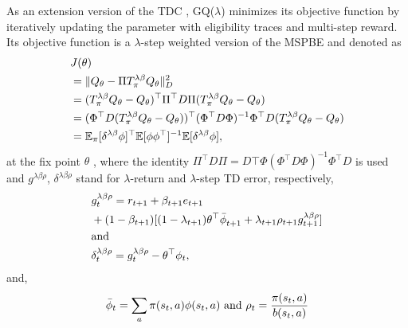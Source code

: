 \documentclass[conference]{IEEEtran}
\begin{document}
As an extension version of the TDC \cite{sutton2009fast}, GQ($\lambda$) minimizes its objective function by iteratively updating the parameter with eligibility traces and multi-step reward. Its objective function is a $\lambda$-step weighted version of the \textup{MSPBE} and denoted as 
\begin{equation}
\begin{split}
  &J(\theta) \\{}
  &= \|Q_\theta - \Pi\mathnormal{T}_\pi^{\lambda\beta}Q_\theta\|^2_D\\
  &=(T_\pi^{\lambda\beta}Q_\theta - Q_\theta)^\top \Pi^\top D\Pi(T_\pi^{\lambda\beta}Q_\theta - Q_\theta)\\
  &=(\Phi^\top D(T_\pi^{\lambda\beta}Q_\theta - Q_\theta))^\top (\Phi^\top D\Phi)^{-1}\Phi^\top D(T_\pi^{\lambda\beta}Q_\theta - Q_\theta)\\
  &=\mathbb{E}_\pi[\delta^{\lambda\beta} \phi]^\top \mathbb{E}[\phi\phi^\top ]^{-1}\mathbb{E}[\delta^{\lambda\beta} \phi],
  \end{split}
\end{equation}
at the fix point $\theta$ \cite{sutton2009fast} \cite{maei2010gq}, where the identity $\Pi^\top D\Pi=D\top\Phi(\Phi^\top D\Phi)^{-1}\Phi^\top D$ is used and $g^{\lambda \beta\rho}$, $\delta^{\lambda\beta\rho}$ stand for $\lambda$-return and $\lambda$-step TD error, respectively,
\begin{equation}  
  \begin{split}
    & g^{\lambda\beta\rho}_t=r_{t+1}+\beta_{t+1}e_{t+1}\\
    &+(1-\beta_{t+1})[(1-\lambda_{t+1})\theta^{\top}{\bar{\phi}}_{t+1}+\lambda_{t+1}\rho_{t+1}g_{t+1}^{\lambda\beta\rho}]\\
    &\textup{and}\\
    &\delta^{\lambda\beta\rho}_t=g^{\lambda\beta\rho}_t-\theta^{\top} \phi_t,
  \end{split}
\end{equation}
and, 
\begin{equation}
\bar{\phi}_t=\sum_a \pi(s_t, a)\phi(s_t, a)\ \textup{and} \ \rho_t = \frac{\pi(s_t, a)}{b(s_t, a)}
\end{equation}
\end{document}
